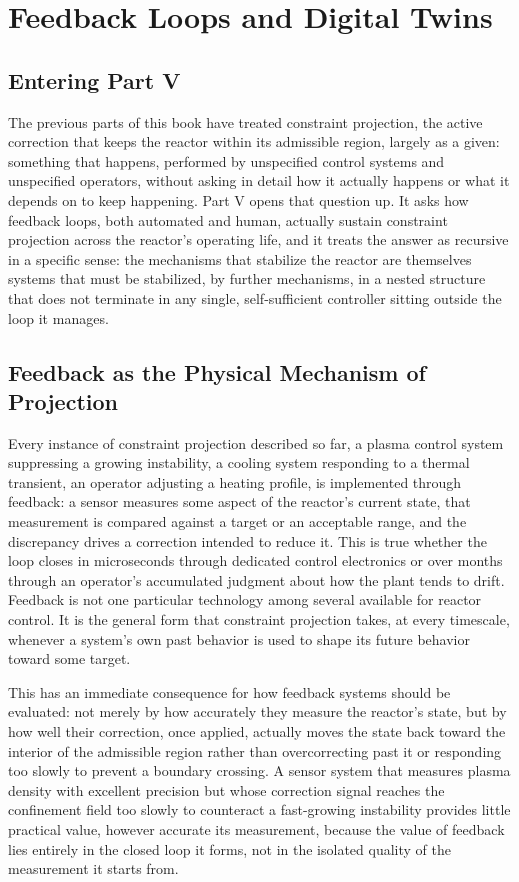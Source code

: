 \chapter{Feedback Loops and Digital Twins}

\section{Entering Part V}

The previous parts of this book have treated constraint projection, the active correction that keeps the reactor within its admissible region, largely as a given: something that happens, performed by unspecified control systems and unspecified operators, without asking in detail how it actually happens or what it depends on to keep happening. Part V opens that question up. It asks how feedback loops, both automated and human, actually sustain constraint projection across the reactor's operating life, and it treats the answer as recursive in a specific sense: the mechanisms that stabilize the reactor are themselves systems that must be stabilized, by further mechanisms, in a nested structure that does not terminate in any single, self-sufficient controller sitting outside the loop it manages.

\section{Feedback as the Physical Mechanism of Projection}

Every instance of constraint projection described so far, a plasma control system suppressing a growing instability, a cooling system responding to a thermal transient, an operator adjusting a heating profile, is implemented through feedback: a sensor measures some aspect of the reactor's current state, that measurement is compared against a target or an acceptable range, and the discrepancy drives a correction intended to reduce it. This is true whether the loop closes in microseconds through dedicated control electronics or over months through an operator's accumulated judgment about how the plant tends to drift. Feedback is not one particular technology among several available for reactor control. It is the general form that constraint projection takes, at every timescale, whenever a system's own past behavior is used to shape its future behavior toward some target.

This has an immediate consequence for how feedback systems should be evaluated: not merely by how accurately they measure the reactor's state, but by how well their correction, once applied, actually moves the state back toward the interior of the admissible region rather than overcorrecting past it or responding too slowly to prevent a boundary crossing. A sensor system that measures plasma density with excellent precision but whose correction signal reaches the confinement field too slowly to counteract a fast-growing instability provides little practical value, however accurate its measurement, because the value of feedback lies entirely in the closed loop it forms, not in the isolated quality of the measurement it starts from.

